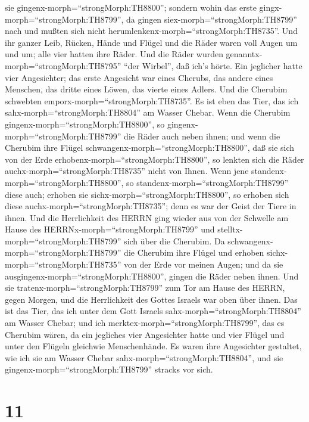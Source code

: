 sie gingenx-morph=``strongMorph:TH8800''; sondern wohin das erste
gingx-morph=``strongMorph:TH8799'', da gingen
siex-morph=``strongMorph:TH8799'' nach und mußten sich nicht
herumlenkenx-morph=``strongMorph:TH8735''.  Und ihr ganzer
Leib, Rücken, Hände und Flügel und die Räder waren voll Augen um und um;
alle vier hatten ihre Räder.  Und die Räder wurden
genanntx-morph=``strongMorph:TH8795'' ``der Wirbel'', daß ich's hörte.
 Ein jeglicher hatte vier Angesichter; das erste Angesicht
war eines Cherubs, das andere eines Menschen, das dritte eines Löwen,
das vierte eines Adlers.  Und die Cherubim schwebten
emporx-morph=``strongMorph:TH8735''. Es ist eben das Tier, das ich
sahx-morph=``strongMorph:TH8804'' am Wasser Chebar.  Wenn
die Cherubim gingenx-morph=``strongMorph:TH8800'', so
gingenx-morph=``strongMorph:TH8799'' die Räder auch neben ihnen; und
wenn die Cherubim ihre Flügel schwangenx-morph=``strongMorph:TH8800'',
daß sie sich von der Erde erhobenx-morph=``strongMorph:TH8800'', so
lenkten sich die Räder auchx-morph=``strongMorph:TH8735'' nicht von
Ihnen.  Wenn jene standenx-morph=``strongMorph:TH8800'', so
standenx-morph=``strongMorph:TH8799'' diese auch; erhoben sie
sichx-morph=``strongMorph:TH8800'', so erhoben sich diese
auchx-morph=``strongMorph:TH8735''; denn es war der Geist der Tiere in
ihnen.  Und die Herrlichkeit des HERRN ging wieder aus von
der Schwelle am Hause des HERRNx-morph=``strongMorph:TH8799'' und
stelltx-morph=``strongMorph:TH8799'' sich über die Cherubim.
 Da schwangenx-morph=``strongMorph:TH8799'' die Cherubim
ihre Flügel und erhoben sichx-morph=``strongMorph:TH8735'' von der Erde
vor meinen Augen; und da sie ausgingenx-morph=``strongMorph:TH8800'',
gingen die Räder neben ihnen. Und sie
tratenx-morph=``strongMorph:TH8799'' zum Tor am Hause des HERRN, gegen
Morgen, und die Herrlichkeit des Gottes Israels war oben über ihnen.
 Das ist das Tier, das ich unter dem Gott Israels
sahx-morph=``strongMorph:TH8804'' am Wasser Chebar; und ich
merktex-morph=``strongMorph:TH8799'', das es Cherubim wären,
 da ein jegliches vier Angesichter hatte und vier Flügel
und unter den Flügeln gleichwie Menschenhände.  Es waren
ihre Angesichter gestaltet, wie ich sie am Wasser Chebar
sahx-morph=``strongMorph:TH8804'', und sie
gingenx-morph=``strongMorph:TH8799'' stracks vor sich.

\hypertarget{section-10}{%
\section{11}\label{section-10}}

